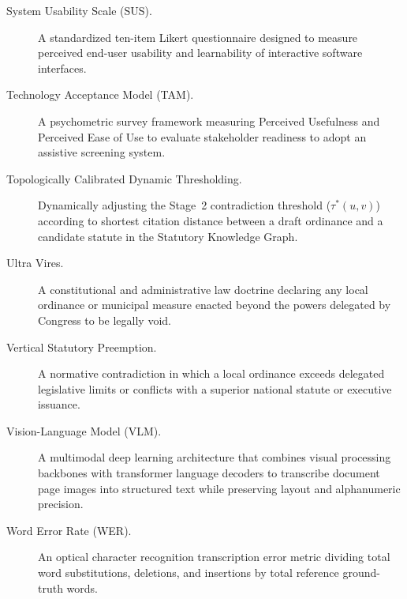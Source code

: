 \begin{description}
    \item[System Usability Scale (SUS).] A standardized ten-item Likert questionnaire designed to measure perceived end-user usability and learnability of interactive software interfaces.

    \item[Technology Acceptance Model (TAM).] A psychometric survey framework measuring Perceived Usefulness and Perceived Ease of Use to evaluate stakeholder readiness to adopt an assistive screening system.

    \item[Topologically Calibrated Dynamic Thresholding.] Dynamically adjusting the Stage~2 contradiction threshold ($\tau^*(u, v)$) according to shortest citation distance between a draft ordinance and a candidate statute in the Statutory Knowledge Graph.

    \item[Ultra Vires.] A constitutional and administrative law doctrine declaring any local ordinance or municipal measure enacted beyond the powers delegated by Congress to be legally void.

    \item[Vertical Statutory Preemption.] A normative contradiction in which a local ordinance exceeds delegated legislative limits or conflicts with a superior national statute or executive issuance.

    \item[Vision-Language Model (VLM).] A multimodal deep learning architecture that combines visual processing backbones with transformer language decoders to transcribe document page images into structured text while preserving layout and alphanumeric precision.

    \item[Word Error Rate (WER).] An optical character recognition transcription error metric dividing total word substitutions, deletions, and insertions by total reference ground-truth words.
\end{description}

